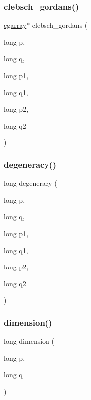 \subsubsection{\texorpdfstring{clebsch\_gordans()}{clebsch\_gordans()}}
{\footnotesize\ttfamily \mbox{\hyperlink{classcgarray}{cgarray}}$\ast$ clebsch\+\_\+gordans (\begin{DoxyParamCaption}\item[{long}]{p,  }\item[{long}]{q,  }\item[{long}]{p1,  }\item[{long}]{q1,  }\item[{long}]{p2,  }\item[{long}]{q2 }\end{DoxyParamCaption})}

\mbox{\label{adat-devel_2lib_2SU3_2SU3_8h_a4ec52994cdf819e465b0743295228e5e}} 
\subsubsection{\texorpdfstring{degeneracy()}{degeneracy()}}
{\footnotesize\ttfamily long degeneracy (\begin{DoxyParamCaption}\item[{long}]{p,  }\item[{long}]{q,  }\item[{long}]{p1,  }\item[{long}]{q1,  }\item[{long}]{p2,  }\item[{long}]{q2 }\end{DoxyParamCaption})}

\mbox{\label{adat-devel_2lib_2SU3_2SU3_8h_a8251acad9553aca00780cebfaaba4d03}} 
\subsubsection{\texorpdfstring{dimension()}{dimension()}}
{\footnotesize\ttfamily long dimension (\begin{DoxyParamCaption}\item[{long}]{p,  }\item[{long}]{q }\end{DoxyParamCaption})}

